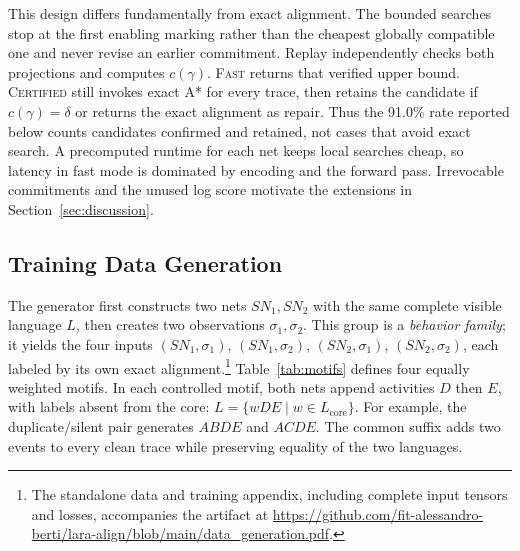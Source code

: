 \documentclass[manuscript,screen,nonacm]{acmart}
\begin{document}
This design differs fundamentally from exact alignment. The bounded searches stop at the first enabling marking rather than the cheapest globally compatible one and never revise an earlier commitment. Replay independently checks both projections and computes $c(\gamma)$. \textsc{Fast} returns that verified upper bound. \textsc{Certified} still invokes exact A* for every trace, then retains the candidate if $c(\gamma)=\delta$ or returns the exact alignment as repair. Thus the 91.0\% rate reported below counts candidates confirmed and retained, not cases that avoid exact search. A precomputed runtime for each net keeps local searches cheap, so latency in fast mode is dominated by encoding and the forward pass. Irrevocable commitments and the unused log score motivate the extensions in Section~\ref{sec:discussion}.

\subsection{Training Data Generation}
\label{sec:data}

The generator first constructs two nets $SN_1,SN_2$ with the same complete visible language $L$, then creates two observations $\sigma_1,\sigma_2$. This group is a \emph{behavior family}; it yields the four inputs $(SN_1,\sigma_1)$, $(SN_1,\sigma_2)$, $(SN_2,\sigma_1)$, $(SN_2,\sigma_2)$, each labeled by its own exact alignment.\footnote{The standalone data and training appendix, including complete input tensors and losses, accompanies the artifact at \url{https://github.com/fit-alessandro-berti/lara-align/blob/main/data_generation.pdf}.} Table~\ref{tab:motifs} defines four equally weighted motifs. In each controlled motif, both nets append activities $D$ then $E$, with labels absent from the core: $L=\{wDE\mid w\in L_{\mathrm{core}}\}$. For example, the duplicate/silent pair generates $ABDE$ and $ACDE$. The common suffix adds two events to every clean trace while preserving equality of the two languages.
\end{document}
